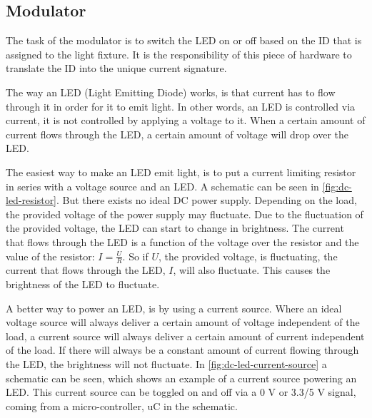 
\subsection{Modulator}

	The task of the modulator is to switch the LED on or off based on the ID that is assigned to the light fixture.
	It is the responsibility of this piece of hardware to translate the ID into the unique current signature.


	The way an LED (Light Emitting Diode) works, is that current has to flow through it in order for it to emit light.
	In other words, an LED is controlled via current, it is not controlled by applying a voltage to it.
	When a certain amount of current flows through the LED, a certain amount of voltage will drop over the LED.

	The easiest way to make an LED emit light, is to put a current limiting resistor in series with a voltage source and an LED.
	A schematic can be seen in \autoref{fig:dc-led-resistor}.
	But there exists no ideal DC power supply.
	Depending on the load, the provided voltage of the power supply may fluctuate.
	Due to the fluctuation of the provided voltage, the LED can start to change in brightness.
	The current that flows through the LED is a function of the voltage over the resistor and the value of the resistor: $I = \frac{U}{R}$.
	So if $U$, the provided voltage, is fluctuating, the current that flows through the LED, $I$, will also fluctuate.
	This causes the brightness of the LED to fluctuate.


	A better way to power an LED, is by using a current source.
	Where an ideal voltage source will always deliver a certain amount of voltage independent of the load, a current source will always deliver a certain amount of current independent of the load.
	If there will always be a constant amount of current flowing through the LED, the brightness will not fluctuate.
	In \autoref{fig:dc-led-current-source} a schematic can be seen, which shows an example of a current source powering an LED.
	This current source can be toggled on and off via a 0 V or 3.3/5 V signal, coming from a micro-controller, uC in the schematic.



